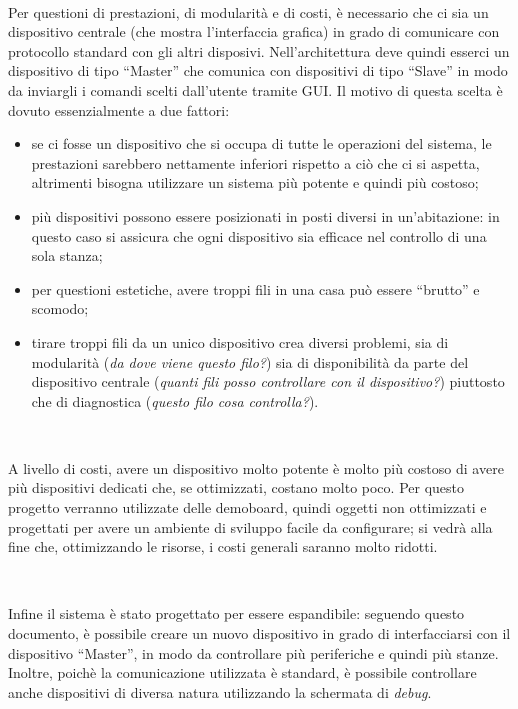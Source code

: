 \documentclass[a4paper,titlepage]{book}
\newcommand{\itema}{\begin{itemize}[noitemsep,topsep=10pt,parsep=5pt,partopsep=10pt]}
\begin{document}
~

Per questioni di prestazioni, di modularità e di costi, è necessario che ci sia un dispositivo centrale (che mostra l'interfaccia grafica) in grado di comunicare con protocollo standard con gli altri disposivi. Nell'architettura deve quindi esserci un dispositivo di tipo ``Master'' che comunica con dispositivi di tipo ``Slave'' in modo da inviargli i comandi scelti dall'utente tramite GUI. Il motivo di questa scelta è dovuto essenzialmente a due fattori:

\itema

\item se ci fosse un dispositivo che si occupa di tutte le operazioni del sistema, le prestazioni sarebbero nettamente inferiori rispetto a ciò che ci si aspetta, altrimenti bisogna utilizzare un sistema più potente e quindi più costoso;

\item più dispositivi possono essere posizionati in posti diversi in un'abitazione: in questo caso si assicura che ogni dispositivo sia efficace nel controllo di una sola stanza;

\item per questioni estetiche, avere troppi fili in una casa può essere ``brutto'' e scomodo;

\item tirare troppi fili da un unico dispositivo crea diversi problemi, sia di modularità (\textit{da dove viene questo filo?}) sia di disponibilità da parte del dispositivo centrale (\textit{quanti fili posso controllare con il dispositivo?}) piuttosto che di diagnostica (\textit{questo filo cosa controlla?}).


\end{itemize}

~

A livello di costi, avere un dispositivo molto potente è molto più costoso di avere più dispositivi dedicati che, se ottimizzati, costano molto poco.
Per questo progetto verranno utilizzate delle demoboard, quindi oggetti non ottimizzati e progettati per avere un ambiente di sviluppo facile da configurare; si vedrà alla fine che, ottimizzando le risorse, i costi generali saranno molto ridotti.

~

Infine il sistema è stato progettato per essere espandibile: seguendo questo documento, è possibile creare un nuovo dispositivo in grado di interfacciarsi con il dispositivo ``Master'', in modo da controllare più periferiche e quindi più stanze. Inoltre, poichè la comunicazione utilizzata è standard, è possibile controllare anche dispositivi di diversa natura utilizzando la schermata di \textit{debug}.
\end{document}
